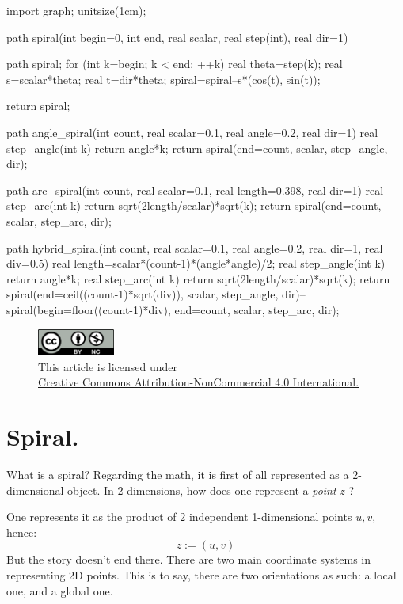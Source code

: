 \documentclass[twoside]{article}
\begin{document}
\begin{asydef}
import graph;
unitsize(1cm);

path spiral(int begin=0, int end, real scalar, real step(int), real dir=1)
{
	path spiral;
	for (int k=begin; k < end; ++k)
	{
		real theta=step(k);
		real s=scalar*theta;
		real t=dir*theta;
		spiral=spiral--s*(cos(t), sin(t));
	}

	return spiral;
}

path angle_spiral(int count, real scalar=0.1, real angle=0.2, real dir=1)
{
	real step_angle(int k) {return angle*k;}
	return spiral(end=count, scalar, step_angle, dir);
}

path arc_spiral(int count, real scalar=0.1, real length=0.398, real dir=1)
{
	real step_arc(int k) {return sqrt(2length/scalar)*sqrt(k);}
	return spiral(end=count, scalar, step_arc, dir);
}

path hybrid_spiral(int count, real scalar=0.1, real angle=0.2, real dir=1, real div=0.5)
{
	real length=scalar*(count-1)*(angle*angle)/2;
	real step_angle(int k) {return angle*k;}
	real step_arc(int k) {return sqrt(2length/scalar)*sqrt(k);}
	return spiral(end=ceil((count-1)*sqrt(div)), scalar, step_angle, dir)--
		spiral(begin=floor((count-1)*div), end=count, scalar, step_arc, dir);
}

\end{asydef}

\begin{figure}[h]
\centering
\includegraphics[width=1in]{../../../cc-by-nc.png}\\[0.1in]
\tiny This article is licensed under \\
\href{http://creativecommons.org/licenses/by-nc/4.0/}
{Creative Commons Attribution-NonCommercial 4.0 International.}\\[0.3in]
\end{figure}

\section*{Spiral.}

What is a spiral? Regarding the math, it is first of all represented as a 2-dimensional object. In 2-dimensions,
how does one represent a \emph{point} $ z $ ?

One represents it as the product of 2 independent 1-dimensional points $ u, v $, hence:
$$ z:=(u,v) $$
But the story doesn't end there. There are two main coordinate systems in representing 2D points. This is to say,
there are two orientations as such: a local one, and a global one.
\end{document}
